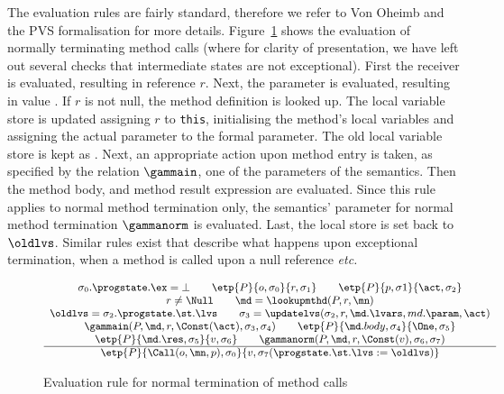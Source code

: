 The evaluation rules are fairly standard, therefore we refer to Von
Oheimb and the PVS formalisation for more details.
Figure~\ref{FigEvalRules} shows the evaluation of normally
terminating method calls (where for clarity of presentation, we have
left out several checks that intermediate states are not exceptional).
First the receiver is evaluated, resulting in reference \(r\).
Next, the parameter is evaluated, resulting in value \act. If \(r\) is not null,
the method definition \md is looked up.
The local variable store is updated assigning
\(r\) to \texttt{this}, initialising the
method's local variables and assigning the actual parameter to the
formal parameter. The old local variable store is kept as \oldlvs.
Next, an appropriate action upon method entry is taken, as specified by the
relation \(\gammain\), one of the parameters of the semantics.
Then the method body, and method result
expression are evaluated. Since this rule applies to normal method
termination only, the semantics' parameter for normal method termination
\(\gammanorm\) is evaluated. Last, the local store is set back to
\(\oldlvs\). %
Similar rules exist that describe what happens upon exceptional termination,
when a method is called upon a null reference \emph{etc.}



\begin{figure}[t]
\[{\small
\begin{array}{c}
\sigma_0.\progstate.\ex = \bot \qquad        %
\etp{P}{o, \sigma_0}{r,\sigma_1} \qquad      %
\etp{P}{p, \sigma1}{\act, \sigma_2}\\        %
r \not= \Null \qquad                         %
\md = \lookupmthd(P, r, \mn) \\
\oldlvs = \sigma_2.\progstate.\st.\lvs \qquad
\sigma_3 = \updatelvs(\sigma_2, r, \md.\lvars, md.\param, \act) \\
\gammain(P, \md, r, \Const(\act), \sigma_3, \sigma_4) \qquad
\etp{P}{\md.body, \sigma_4}{\One,\sigma_5} \\
\etp{P}{\md.\res, \sigma_5}{v,\sigma_6}\qquad
\gammanorm(P, \md, r, \Const(v), \sigma_6, \sigma_7)\\
\hline
\etp{P}{\Call(o,\mn,p), \sigma_0}{v, \sigma_7
(\progstate.\st.\lvs := \oldlvs)}
\end{array}}
\]
\caption{Evaluation rule for normal termination of method
calls}\label{FigEvalRules}
\end{figure}

